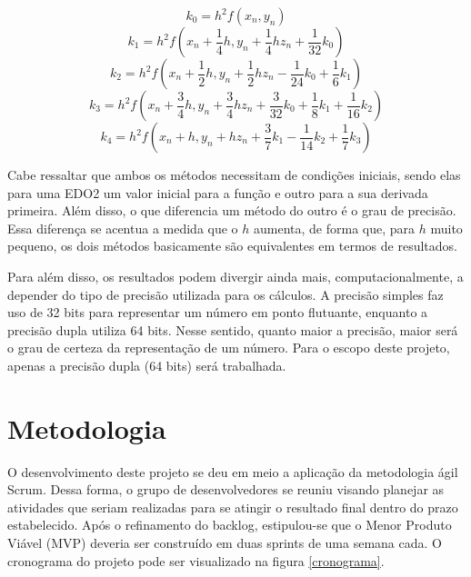 \documentclass[a4paper,11pt]{article}
\begin{document}
    \begin{equation}
        \label{k_0}
        k_0=h^2f(x_n,y_n)
    \end{equation}
    \begin{equation}
        \label{k_1}
        k_1=h^2f\left(x_n+\frac{1}{4}h,y_n+\frac{1}{4}hz_n+\frac{1}{32}k_0\right)
    \end{equation}
    \begin{equation}
        \label{k_2}
        k_2=h^2f\left(x_n+\frac{1}{2}h,y_n+\frac{1}{2}hz_n-\frac{1}{24}k_0+\frac{1}{6}k_1\right)
    \end{equation}
    \begin{equation}
        \label{k_3}
        k_3=h^2f\left(x_n+\frac{3}{4}h,y_n+\frac{3}{4}hz_n+\frac{3}{32}k_0+\frac{1}{8}k_1+\frac{1}{16}k_2\right)
    \end{equation}
    \begin{equation}
        \label{k_4}
        k_4=h^2f\left(x_n+h,y_n+hz_n+\frac{3}{7}k_1-\frac{1}{14}k_2+\frac{1}{7}k_3\right)
    \end{equation}
    
    Cabe ressaltar que ambos os métodos necessitam de condições iniciais, sendo elas para uma EDO2 um valor inicial para a função e outro para a sua derivada primeira. Além disso, o que diferencia um método do outro é o grau de precisão. Essa diferença se acentua a medida que o $h$ aumenta, de forma que, para $h$ muito pequeno, os dois métodos basicamente são equivalentes em termos de resultados. 
    
    
    Para além disso, os resultados podem divergir ainda mais, computacionalmente, a depender do tipo de precisão utilizada para os cálculos. A precisão simples faz uso de 32 bits para representar um número em ponto flutuante, enquanto a precisão dupla utiliza 64 bits. Nesse sentido, quanto maior a precisão, maior será o grau de certeza da representação de um número. Para o escopo deste projeto, apenas a precisão dupla (64 bits) será trabalhada.
\pagebreak

\section{Metodologia}

    O desenvolvimento deste projeto se deu em meio a aplicação da metodologia ágil Scrum. Dessa forma, o grupo de desenvolvedores se reuniu visando planejar as atividades que seriam realizadas para se atingir o resultado final dentro do prazo estabelecido. Após o refinamento do backlog, estipulou-se que o Menor Produto Viável (MVP) deveria ser construído em duas sprints de uma semana cada. O cronograma do projeto pode ser visualizado na figura \ref{cronograma}.
    
\end{document}
